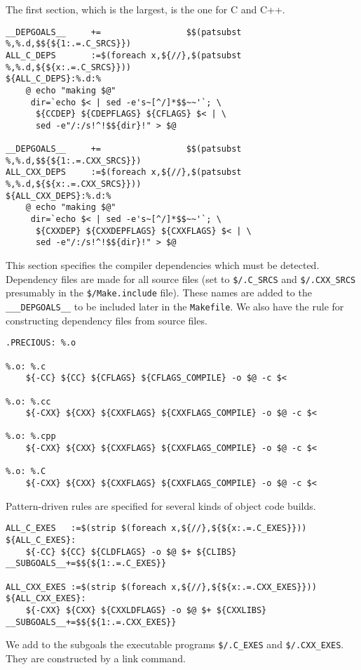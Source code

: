 \documentclass[letterpaper]{article}
\begin{document}
The first section, which is the largest, is the one for C and C++.
\begin{verbatim}
__DEPGOALS__     +=                 $$(patsubst %,%.d,$${${1:.=.C_SRCS}})
ALL_C_DEPS       :=$(foreach x,${//},$(patsubst %,%.d,${${x:.=.C_SRCS}}))
${ALL_C_DEPS}:%.d:%
	@ echo "making $@"
	 dir=`echo $< | sed -e's~[^/]*$$~~'`; \
	  ${CCDEP} ${CDEPFLAGS} ${CFLAGS} $< | \
	  sed -e"/:/s!^!$${dir}!" > $@

__DEPGOALS__     +=                 $$(patsubst %,%.d,$${${1:.=.CXX_SRCS}})
ALL_CXX_DEPS     :=$(foreach x,${//},$(patsubst %,%.d,${${x:.=.CXX_SRCS}}))
${ALL_CXX_DEPS}:%.d:%
	@ echo "making $@"
	 dir=`echo $< | sed -e's~[^/]*$$~~'`; \
	  ${CXXDEP} ${CXXDEPFLAGS} ${CXXFLAGS} $< | \
	  sed -e"/:/s!^!$${dir}!" > $@
\end{verbatim}
This section specifies the compiler dependencies which must be
detected.  Dependency files are made for all source files
(set to \verb+$/.C_SRCS+ and \verb+$/.CXX_SRCS+ presumably in
the \verb+$/Make.include+ file).  These
names are added to the \verb+___DEPGOALS__+ to be included later
in the \verb+Makefile+.  We also have the rule for constructing
dependency files from source files.

\begin{verbatim}
.PRECIOUS: %.o

%.o: %.c
	${-CC} ${CC} ${CFLAGS} ${CFLAGS_COMPILE} -o $@ -c $<

%.o: %.cc
	${-CXX} ${CXX} ${CXXFLAGS} ${CXXFLAGS_COMPILE} -o $@ -c $<

%.o: %.cpp
	${-CXX} ${CXX} ${CXXFLAGS} ${CXXFLAGS_COMPILE} -o $@ -c $<

%.o: %.C
	${-CXX} ${CXX} ${CXXFLAGS} ${CXXFLAGS_COMPILE} -o $@ -c $<

\end{verbatim}
Pattern-driven rules are specified for several kinds of
object code builds.

\begin{verbatim}
ALL_C_EXES   :=$(strip $(foreach x,${//},${${x:.=.C_EXES}}))
${ALL_C_EXES}:
	${-CC} ${CC} ${CLDFLAGS} -o $@ $+ ${CLIBS}
__SUBGOALS__+=$${${1:.=.C_EXES}}

ALL_CXX_EXES :=$(strip $(foreach x,${//},${${x:.=.CXX_EXES}}))
${ALL_CXX_EXES}:
	${-CXX} ${CXX} ${CXXLDFLAGS} -o $@ $+ ${CXXLIBS}
__SUBGOALS__+=$${${1:.=.CXX_EXES}}
\end{verbatim}
We add to the subgoals the executable programs \verb+$/.C_EXES+ and
\verb+$/.CXX_EXES+.  They are constructed by a link command.
\end{document}
